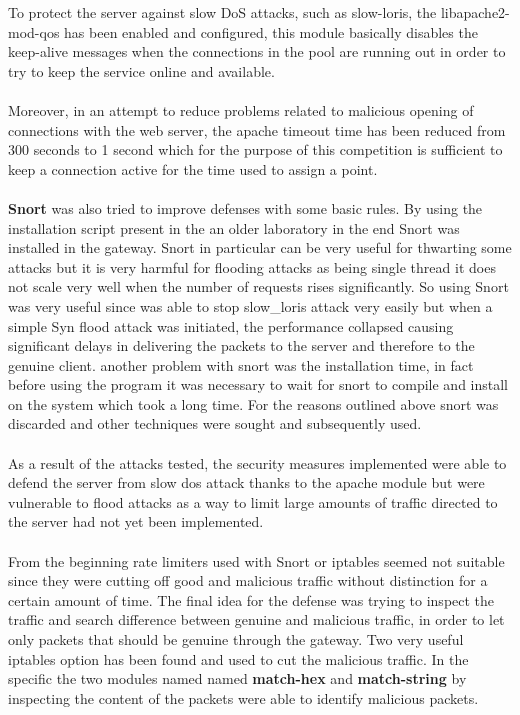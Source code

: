 \documentclass[14pt]{article}
\begin{document}
To protect the server against slow DoS attacks, such as slow-loris, the libapache2-mod-qos has been enabled and configured, this module basically disables the keep-alive messages when the connections in the pool are running out in order to try to keep the service online and available.
\\
\\ 
Moreover, in an attempt to reduce problems related to malicious opening of connections with the web server, the apache timeout time has been reduced from 300 seconds to 1 second which for the purpose of this competition is sufficient to keep a connection active for the time used to assign a point.
\\
\\
\textbf{Snort} was also tried to improve defenses with some basic rules. By using the installation script present in the an older laboratory in the end Snort was installed in the gateway. Snort in particular can be very useful for thwarting some attacks but it is very harmful for flooding attacks as being single thread it does not scale very well when the number of requests rises significantly. So using Snort was very useful since was able to stop slow\_loris attack very easily but when a simple Syn flood attack was initiated, the performance collapsed causing significant delays in delivering the packets to the server and therefore to the genuine client. another problem with snort was the installation time, in fact before using the program it was necessary to wait for snort to compile and install on the system which took a long time. For the reasons outlined above snort was discarded and other techniques were sought and subsequently used.
\\
\\
As a result of the attacks tested, the security measures implemented were able to defend the server from slow dos attack thanks to the apache module but were vulnerable to flood attacks as a way to limit large amounts of traffic directed to the server had not yet been implemented.
\\
\\
From the beginning rate limiters used with Snort or iptables seemed not suitable since they were cutting off good and malicious traffic without distinction for a certain amount of time. The final idea for the defense was trying to inspect the traffic and search difference between genuine and malicious traffic, in order to let only packets that should be genuine through the gateway. Two very useful iptables option has been found and used to cut the malicious traffic. In the specific the two modules named named \textbf{match-hex} and \textbf{match-string} by inspecting the content of the packets were able to identify malicious packets. 
\end{document}
